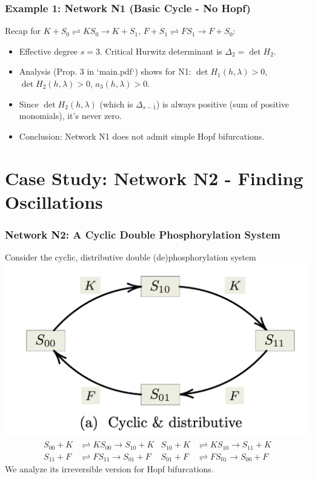 \documentclass[aspectratio=169]{beamer}
\begin{document}
\begin{frame}{\insertsectionhead}
	\frametitle{Example 1: Network N1 (Basic Cycle - No Hopf)}
	Recap for $K + S_0 \rightleftharpoons KS_0 \rightarrow K + S_1$, $F + S_1 \rightleftharpoons FS_1 \rightarrow F + S_0$:
	\begin{itemize}
		\item Effective degree $s=3$. Critical Hurwitz determinant is $\Delta_2 = \det H_2$.
		\item Analysis (Prop. 3 in `main.pdf`) shows for N1:
			$\det H_1(h, \lambda) > 0$, $\det H_2(h, \lambda) > 0$, $a_3(h, \lambda) > 0$.
		\item Since $\det H_2(h, \lambda)$ (which is $\Delta_{s-1}$) is always positive (sum of positive monomials), it's \alert{never zero}.
		\item \alert{Conclusion}: Network N1 does not admit simple Hopf bifurcations.
	\end{itemize}
\end{frame}

\section{Case Study: Network N2 - Finding Oscillations}

\begin{frame}{\insertsectionhead}
	\frametitle{Network N2: A Cyclic Double Phosphorylation System}
	Consider the cyclic, distributive double (de)phosphorylation system
	\centering
	\includegraphics[width=0.6\linewidth]{pics/cyclic-distributive-n1.png} \\
	\begin{align*}
		S_{00} + K &\rightleftharpoons KS_{00} \rightarrow S_{10} + K & S_{10} + K &\rightleftharpoons KS_{10} \rightarrow S_{11} + K \\
		S_{11} + F &\rightleftharpoons FS_{11} \rightarrow S_{01} + F & S_{01} + F &\rightleftharpoons FS_{01} \rightarrow S_{00} + F
	\end{align*}
	We analyze its \alert{irreversible version} for Hopf bifurcations.
\end{frame}
\end{document}
